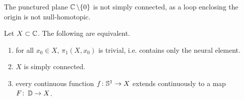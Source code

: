 \documentclass[a4paper,english]{article}
\begin{document}
\begin{example}
    The punctured plane $\CC \setminus \{ 0 \}$ is not simply connected, as a loop enclosing the origin is not null-homotopic.
\end{example}

\begin{lemma}[Contractability]
    Let $X \subset \CC$.
    The following are equivalent.
    \begin{enumerate}
        \item
        for all $x_0 \in X$, $\pi_1(X, x_0)$ is trivial, i.e. contains only the neural element.
        
        \item
        $X$ is simply connected.
        
        \item
        every continuous function $f \colon \S^1 \to X$ extends continuously to a map $F \colon \D \to X$.
    \end{enumerate}
\end{lemma}
\end{document}
